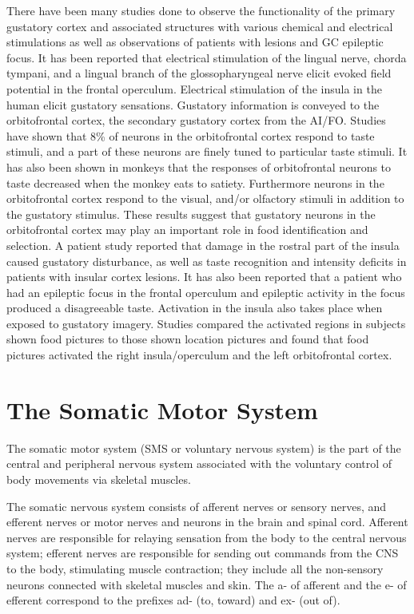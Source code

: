 There have been many studies done to observe the functionality of the primary gustatory cortex and associated structures with various chemical and electrical stimulations as well as observations of patients with lesions and GC epileptic focus. It has been reported that electrical stimulation of the lingual nerve, chorda tympani, and a lingual branch of the glossopharyngeal nerve elicit evoked field potential in the frontal operculum. Electrical stimulation of the insula in the human elicit gustatory sensations. Gustatory information is conveyed to the orbitofrontal cortex, the secondary gustatory cortex from the AI/FO. Studies have shown that 8\% of neurons in the orbitofrontal cortex respond to taste stimuli, and a part of these neurons are finely tuned to particular taste stimuli. It has also been shown in monkeys that the responses of orbitofrontal neurons to taste decreased when the monkey eats to satiety. Furthermore neurons in the orbitofrontal cortex respond to the visual, and/or olfactory stimuli in addition to the gustatory stimulus. These results suggest that gustatory neurons in the orbitofrontal cortex may play an important role in food identification and selection. A patient study reported that damage in the rostral part of the insula caused gustatory disturbance, as well as taste recognition and intensity deficits in patients with insular cortex lesions. It has also been reported that a patient who had an epileptic focus in the frontal operculum and epileptic activity in the focus produced a disagreeable taste. Activation in the insula also takes place when exposed to gustatory imagery. Studies compared the activated regions in subjects shown food pictures to those shown location pictures and found that food pictures activated the right insula/operculum and the left orbitofrontal cortex.

\hypertarget{the-somatic-motor-system}{%
\chapter{The Somatic Motor System}\label{the-somatic-motor-system}}

The somatic motor system (SMS or voluntary nervous system) is the part of the central and peripheral nervous system associated with the voluntary control of body movements via skeletal muscles.

The somatic nervous system consists of afferent nerves or sensory nerves, and efferent nerves or motor nerves and neurons in the brain and spinal cord. Afferent nerves are responsible for relaying sensation from the body to the central nervous system; efferent nerves are responsible for sending out commands from the CNS to the body, stimulating muscle contraction; they include all the non-sensory neurons connected with skeletal muscles and skin. The a- of afferent and the e- of efferent correspond to the prefixes ad- (to, toward) and ex- (out of).

